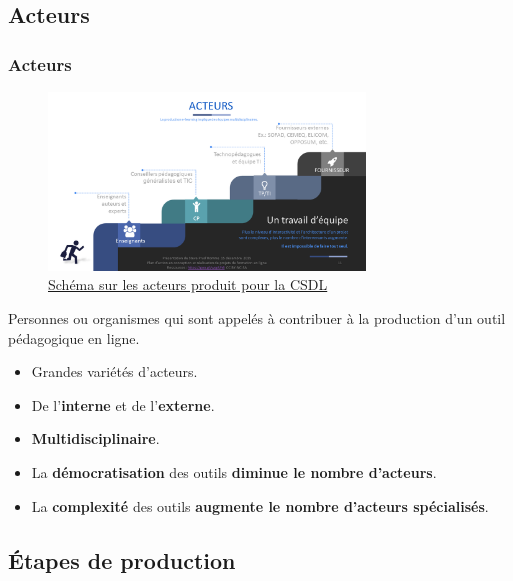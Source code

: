 		 \subsection{Acteurs} 
					\begin{frame}[allowframebreaks]
						\frametitle{Acteurs}
                        			\begin{figure}
                     			\centering
                    			 \includegraphics[width = 0.75\textwidth]{acteurs.png}
                     			\caption{\tiny{\href{run:acteurs.png}{Schéma sur les acteurs produit pour la CSDL}}}
                   			\end{figure}
                        			Personnes ou organismes qui sont appelés à contribuer à la production d’un outil pédagogique en ligne.
							\begin{itemize}
							\item Grandes variétés d'acteurs.
							\item De l'\textbf{interne} et de l'\textbf{externe}.
							\item \textbf{Multidisciplinaire}.								
							\item La \textbf{démocratisation} des outils \textbf{diminue le nombre d'acteurs}.
							\item La \textbf{complexité} des outils \textbf{augmente le nombre d'acteurs spécialisés}.
							\end{itemize}
						
					\end{frame}
					
					
					
					 \subsection{Étapes de production}
					  
